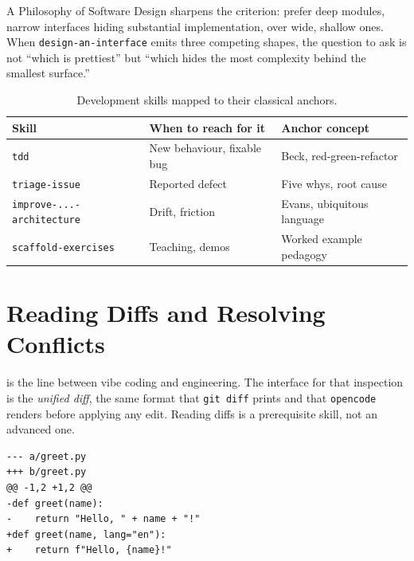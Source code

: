 \documentclass{../sharedAssets/tufte}
\begin{document}
 A Philosophy of Software
Design\cite{ousterhout2018philosophy} sharpens the criterion: prefer
deep modules, narrow interfaces hiding substantial
implementation, over wide, shallow ones. When \texttt{design-an-interface}
emits three competing shapes, the question to ask is not ``which is
prettiest'' but ``which hides the most complexity behind the smallest
surface.''

\begin{table}[ht]
\begin{tabular}{p{}p{}p{}}
\toprule
\textbf{Skill} & \textbf{When to reach for it} & \textbf{Anchor concept} \\
\midrule
\texttt{tdd}            & New behaviour, fixable bug & Beck, red-green-refactor \\
\texttt{triage-issue}   & Reported defect            & Five whys, root cause \\
\texttt{improve-...-architecture}  & Drift, friction & Evans, ubiquitous language \\
\texttt{scaffold-exercises} & Teaching, demos & Worked example pedagogy \\
\bottomrule
\end{tabular}
\vspace{1em}
\caption{Development skills mapped to their classical anchors.}
\label{tab:dev-skills}
\end{table}

\section{Reading Diffs and Resolving Conflicts}
\label{sec:diffs-merges}

 is the line between vibe
coding and engineering. The interface for that inspection is the
\emph{unified diff}, the same format that \texttt{git diff} prints and that
\texttt{opencode} renders before applying any edit. Reading diffs is a
prerequisite skill, not an advanced one.

\begin{fullwidth}
\begin{verbatim}
--- a/greet.py
+++ b/greet.py
@@ -1,2 +1,2 @@
-def greet(name):
-    return "Hello, " + name + "!"
+def greet(name, lang="en"):
+    return f"Hello, {name}!"
\end{verbatim}
\end{fullwidth}
\end{document}

